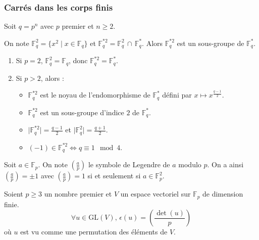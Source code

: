   \subsubsection{Carrés dans les corps finis}


  Soit $q = p^n$ avec $p$ premier et $n \geq 2$.

  \begin{proposition}
    On note $\mathbb{F}_q^2 = \{ x^2 \mid x \in \mathbb{F}_q \}$ et $\mathbb{F}_q^{*2} = \mathbb{F}_q^2 \, \cap \, \mathbb{F}_q^*$. Alors $\mathbb{F}_q^{*2}$ est un sous-groupe de $\mathbb{F}_q^*$.
  \end{proposition}

  \begin{proposition}
    \begin{enumerate}[label=(\roman*)]
      \item Si $p = 2$, $\mathbb{F}_q^2 = \mathbb{F}_q$, donc $\mathbb{F}_q^{*2} = \mathbb{F}_q^*$.
      \item Si $p > 2$, alors :
      \begin{itemize}
        \item $\mathbb{F}_q^{*2}$ est le noyau de l'endomorphisme de $\mathbb{F}_q^*$ défini par $x \mapsto x^{\frac{q-1}{2}}$.
        \item $\mathbb{F}_q^{*2}$ est un sous-groupe d'indice $2$ de $\mathbb{F}_q^*$.
        \item $\vert \mathbb{F}_q^{*2} \vert = \frac{q-1}{2}$ et $\vert \mathbb{F}_q^2 \vert = \frac{q+1}{2}$.
        \item $(-1) \in \mathbb{F}_q^{*2} \iff q \equiv 1 \mod 4$.
      \end{itemize}
    \end{enumerate}
  \end{proposition}


  \begin{notation}
    Soit $a \in \mathbb{F}_p$. On note $\left( \frac{a}{p} \right)$ le symbole de Legendre de $a$ modulo $p$. On a ainsi $\left( \frac{a}{p} \right) = \pm 1$ avec $\left( \frac{a}{p} \right) = 1$ si et seulement si $a \in \mathbb{F}_p^2$.
  \end{notation}

  \begin{application}
    Soient $p \geq 3$ un nombre premier et $V$ un espace vectoriel sur $\mathbb{F}_p$ de dimension finie.
    \[ \forall u \in \mathrm{GL}(V), \, \epsilon(u) = \left( \frac{\det(u)}{p} \right) \]
    où $u$ est vu comme une permutation des éléments de $V$.
  \end{application}

